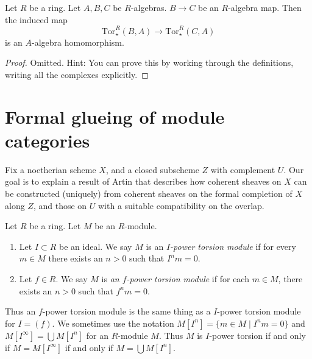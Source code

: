 \begin{lemma}
\label{lemma-functoriality-product-tor}
Let $R$ be a ring. Let $A, B, C$ be $R$-algebras.
$B \to C$ be an $R$-algebra map. Then the induced map
$$
\text{Tor}^R_{\star}(B, A)
\longrightarrow
\text{Tor}^R_{\star}(C, A)
$$
is an $A$-algebra homomorphism.
\end{lemma}

\begin{proof}
Omitted. Hint: You can prove this by working through the definitions,
writing all the complexes explicitly.
\end{proof}










\section{Formal glueing of module categories}
\label{section-formal-glueing}

\noindent
Fix a noetherian scheme $X$, and a closed subscheme $Z$ with complement $U$. 
Our goal is to explain a result of Artin that describes how coherent sheaves on 
$X$ can be constructed (uniquely) from coherent sheaves on the formal 
completion of $X$ along $Z$, and those on $U$ with a suitable compatibility on 
the overlap.

\begin{definition}
\label{definition-f-power-torsion}
Let $R$ be a ring. Let $M$ be an $R$-module.
\begin{enumerate}
\item Let $I \subset R$ be an ideal. We say $M$ is an
{\it $I$-power torsion module} if for every $m \in M$ there exists an $n > 0$
such that $I^n m = 0$.
\item Let $f \in R$. We say $M$ is 
{\it an $f$-power torsion module} if for each 
$m \in M$, there exists an $n > 0$ such that $f^n m = 0$.
\end{enumerate}
\end{definition}

\noindent
Thus an $f$-power torsion module is the same thing as a $I$-power torsion
module for $I = (f)$. We sometimes use the notation
$M[I^n] = \{m \in M \mid I^nm = 0\}$ and $M[I^\infty] = \bigcup M[I^n]$
for an $R$-module $M$. Thus $M$ is $I$-power torsion if and only if
$M = M[I^\infty]$ if and only if $M = \bigcup M[I^n]$.

